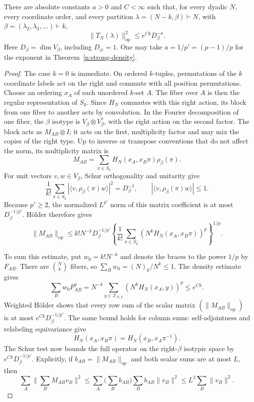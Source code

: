 \begin{proposition}
\label{n:strong-tail}
There are absolute constants $a>0$ and $C<\infty$ such that, for
every dyadic $N$, every coordinate order, and every partition
$\lambda=(N-k,\beta)\vdash N$, with
$\beta=(\lambda_2,\lambda_3,\ldots)\vdash k$,
\begin{equation}\label{n:strong-tail-eq}
 \|T_N(\lambda)\|_{\mathrm{op}}^2
       \le e^{Ck}D_\beta^{-a}.
\end{equation}
Here $D_\beta=\dim V_\beta$, including $D_\varnothing=1$.
One may take $a=1/p'=(p-1)/p$ for the exponent in
Theorem~\ref{n:strong-density}.
\end{proposition}

\begin{proof}
The case $k=0$ is immediate.  On ordered $k$-tuples, permutations
of the $k$ coordinate labels act on the right and commute with all
position permutations.  Choose an ordering $x_A$ of each unordered
$k$-set $A$.  The fiber over $A$ is then the regular representation
of $S_k$.  Since $H_N$ commutes with this right action, its block
from one fiber to another acts by convolution.  In the Fourier
decomposition of one fiber, the $\beta$ isotype is
$V_\beta\otimes V_\beta^*$, with the right action on the second
factor.  The block acts as $M_{AB}\otimes I$; it acts on the first,
multiplicity factor and may mix the copies of the right type.
Up to inverse or transpose conventions that do not affect the norm,
its multiplicity matrix is
\[
 M_{AB}=\sum_{\pi\in S_k}
                  H_N(x_A,x_B\pi)\rho_\beta(\pi).
\]
For unit vectors $v,w\in V_\beta$, Schur orthogonality
\cite[Proposition~3.14(ii)]{etingof} and unitarity give
\[
 \frac1{k!}\sum_{\pi\in S_k}
       |\langle v,\rho_\beta(\pi)w\rangle|^2=D_\beta^{-1},
 \qquad |\langle v,\rho_\beta(\pi)w\rangle|\le1.
\]
Because $p'\ge2$, the normalized $L^{p'}$ norm of this matrix
coefficient is at most $D_\beta^{-1/p'}$.  H\"older therefore gives
\begin{equation}\label{n:strong-slot-block}
 \|M_{AB}\|_{\mathrm{op}}
 \le k!N^{-k}D_\beta^{-1/p'}
 \left\{\frac1{k!}\sum_{\pi\in S_k}
       (N^kH_N(x_A,x_B\pi))^p\right\}^{1/p}.
\end{equation}

To sum this estimate, put $w_0=k!N^{-k}$ and denote the braces
to the power $1/p$ by $F_{AB}$.  There are $\binom Nk$ fibers,
so $\sum_Bw_0=(N)_k/N^k\le1$.  The density estimate gives
\[
 \sum_Bw_0 F_{AB}^p
 =N^{-k}\sum_{y\in\mathcal X_{N,k}}
             (N^kH_N(x_A,y))^p\le e^{Ck}.
\]
Weighted H\"older shows that every row sum of the scalar matrix
$(\|M_{AB}\|_{\mathrm{op}})$ is at most
$e^{Ck}D_\beta^{-1/p'}$.  The same bound holds for column sums:
self-adjointness and relabeling equivariance give
\[
 H_N(x_A,x_B\pi)=H_N(x_B,x_A\pi^{-1}).
\]
The Schur test now bounds the full operator on the right-$\beta$
isotypic space by $e^{Ck}D_\beta^{-1/p'}$.  Explicitly, if
$b_{AB}=\|M_{AB}\|_{\mathrm{op}}$ and both scalar sums are at most
$L$, then
\[
 \sum_A\Big\|\sum_BM_{AB}v_B\Big\|^2
 \le\sum_A\Big(\sum_Bb_{AB}\Big)
                    \sum_Bb_{AB}\|v_B\|^2
 \le L^2\sum_B\|v_B\|^2.
\]


\end{proof}
